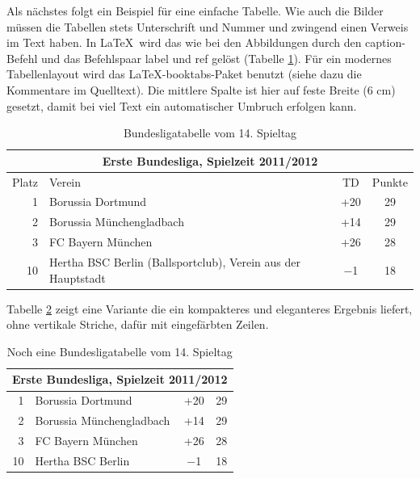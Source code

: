 Als nächstes folgt ein Beispiel für eine einfache Tabelle. Wie auch die Bilder müssen die Tabellen stets Unterschrift und Nummer und zwingend einen Verweis im Text haben. In \LaTeX\ wird das wie bei den Abbildungen durch den caption-Befehl und das Befehlspaar label und ref gelöst (Tabelle \ref{t_buli}). Für ein modernes Tabellenlayout wird das \LaTeX-booktabs-Paket benutzt (siehe dazu die Kommentare im Quelltext). Die mittlere Spalte ist hier auf feste Breite (6 cm) gesetzt, damit bei viel Text ein automatischer Umbruch erfolgen kann.

\begin{table}[htp] 
\centering
\begin{tabular}{r|p{6cm}|c|c}  %
\toprule
\multicolumn{4}{c}{\large\bfseries Erste Bundesliga, Spielzeit 2011/2012}\\ \midrule
Platz & Verein & TD & Punkte\\ \midrule
1 & Borussia Dortmund & +20 & 29\\ \midrule
2 & Borussia Münchengladbach & +14 & 29\\ \midrule
3 & FC Bayern München & +26 & 28 \\ \midrule
10 & Hertha BSC Berlin (Ballsportclub), Verein aus der Hauptstadt & $-$1 & 18\\
\bottomrule
\end{tabular}
\caption{Bundesligatabelle vom 14. Spieltag}\label{t_buli}
\end{table}

Tabelle \ref{t_buli2} zeigt eine Variante die ein kompakteres und eleganteres Ergebnis liefert, ohne vertikale Striche, dafür mit eingefärbten Zeilen.

\begin{table}[htp] 
\centering
\begin{tabular}{rlcc}  %
\toprule
\multicolumn{4}{c}{\large\sffamily Erste Bundesliga, Spielzeit 2011/2012}\\ \midrule
1 & Borussia Dortmund & +20 & 29\\ 
2 & Borussia Münchengladbach & +14 & 29\\
3 & FC Bayern München & +26 & 28\\
10 & Hertha BSC Berlin & $-$1 & 18 \\ \bottomrule
\end{tabular}
\caption{Noch eine Bundesligatabelle vom 14. Spieltag}\label{t_buli2}
\end{table}



